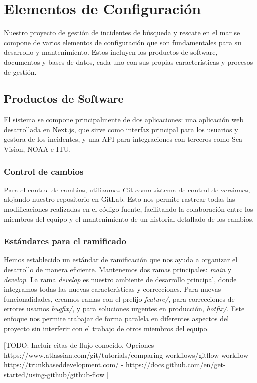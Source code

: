 \section{Elementos de Configuración}\label{sec:elementosDeConfiguracion}

Nuestro proyecto de gestión de incidentes de búsqueda y rescate en el mar se compone de varios elementos de configuración que 
son fundamentales para su desarrollo y mantenimiento. Estos incluyen los productos de software, documentos y bases de datos, 
cada uno con sus propias características y procesos de gestión.

\subsection{Productos de Software}
El sistema se compone principalmente de dos aplicaciones: una aplicación web desarrollada en Next.js, que sirve como interfaz 
principal para los usuarios y gestora de los incidentes, y una API para integraciones con terceros como Sea Vision, NOAA e ITU.

\subsubsection{Control de cambios}
Para el control de cambios, utilizamos Git como sistema de control de versiones, alojando nuestro repositorio en GitLab. Esto nos 
permite rastrear todas las modificaciones realizadas en el código fuente, facilitando la colaboración entre los miembros del equipo 
y el mantenimiento de un historial detallado de los cambios.

\subsubsection{Estándares para el ramificado}
Hemos establecido un estándar de ramificación que nos ayuda a organizar el desarrollo de manera eficiente. Mantenemos dos ramas 
principales: \textit{main} y \textit{develop}. La rama \textit{develop} es nuestro ambiente de desarrollo principal, donde integramos todas las nuevas 
características y correcciones. Para nuevas funcionalidades, creamos ramas con el prefijo \textit{feature/}, para correcciones de errores 
usamos \textit{bugfix/}, y para soluciones urgentes en producción, \textit{hotfix/}. Este enfoque nos permite trabajar de forma paralela en diferentes 
aspectos del proyecto sin interferir con el trabajo de otros miembros del equipo.

[TODO: Incluir citas de flujo conocido. Opciones
- https://www.atlassian.com/git/tutorials/comparing-workflows/gitflow-workflow
- https://trunkbaseddevelopment.com/
- https://docs.github.com/en/get-started/using-github/github-flow
]


